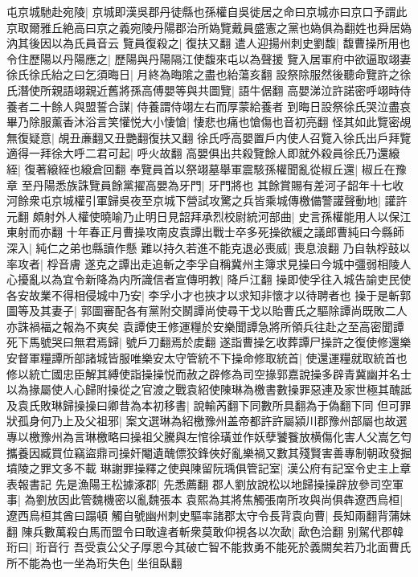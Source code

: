 屯京城馳赴宛陵|{
	京城即漢吳郡丹徒縣也孫權自吳徙居之命曰京城亦曰京口予謂此京取爾雅丘絶高曰京之義宛陵丹陽郡治所媯覽戴員盛憲之黨也媯俱為翻姓也舜居媯汭其後因以為氏員音云}
覽員復殺之|{
	復扶又翻}
遣人迎揚州刺史劉馥|{
	馥曹操所用也}
令住歷陽以丹陽應之|{
	歷陽與丹陽隔江使馥來屯以為聲援}
覽入居軍府中欲逼取翊妻徐氏徐氏紿之曰乞須晦日|{
	月終為晦隂之盡也紿蕩亥翻}
設祭除服然後聽命覽許之徐氏潛使所親語翊親近舊將孫高傅嬰等與共圖覽|{
	語牛倨翻}
高嬰涕泣許諾密呼翊時侍養者二十餘人與盟誓合謀|{
	侍養謂侍翊左右而厚蒙給養者}
到晦日設祭徐氏哭泣盡哀畢乃除服薰香沐浴言笑懽悦大小悽愴|{
	悽悲也痛也愴傷也音初亮翻}
怪其如此覽密覘無復疑意|{
	覘丑亷翻又丑艷翻復扶又翻}
徐氏呼高嬰置戶内使人召覽入徐氏出戶拜覽適得一拜徐大呼二君可起|{
	呼火故翻}
高嬰俱出共殺覽餘人即就外殺員徐氏乃還縗絰|{
	復著縗絰也縗倉回翻}
奉覽員首以祭翊墓舉軍震駭孫權聞亂從椒丘還|{
	椒丘在豫章}
至丹陽悉族誅覽員餘黨擢高嬰為牙門|{
	牙門將也}
其餘賞賜有差河子韶年十七收河餘衆屯京城權引軍歸吳夜至京城下營試攻驚之兵皆乘城傳檄備警讙聲動地|{
	讙許元翻}
頗射外人權使曉喻乃止明日見韶拜承烈校尉統河部曲|{
	史言孫權能用人以保江東射而亦翻}
十年春正月曹操攻南皮袁譚出戰士卒多死操欲緩之議郎曹純曰今縣師深入|{
	純仁之弟也縣讀作懸}
難以持久若進不能克退必喪威|{
	喪息浪翻}
乃自執桴鼓以率攻者|{
	桴音膚}
遂克之譚出走追斬之李孚自稱冀州主簿求見操曰今城中彊弱相陵人心擾亂以為宜令新降為内所識信者宣傳明教|{
	降戶江翻}
操即使孚往入城告諭吏民使各安故業不得相侵城中乃安|{
	李孚小才也挾才以求知非懷才以待聘者也}
操于是斬郭圖等及其妻子|{
	郭圖審配各有黨附交鬭譚尚使尋干戈以貽曹氏之驅除譚尚既敗二人亦誅禍福之報為不爽矣}
袁譚使王修運糧於安樂聞譚急將所領兵往赴之至高密聞譚死下馬號哭曰無君焉歸|{
	號戶刀翻焉於䖍翻}
遂詣曹操乞收葬譚尸操許之復使修還樂安督軍糧譚所部諸城皆服唯樂安太守管統不下操命修取統首|{
	使還運糧就取統首也}
修以統亡國忠臣解其縛使詣操操悦而赦之辟修為司空掾郭嘉說操多辟青冀幽并名士以為掾屬使人心歸附操從之官渡之戰袁紹使陳琳為檄書數操罪惡連及家世極其醜詆及袁氏敗琳歸操操曰卿昔為本初移書|{
	說輸芮翻下同數所具翻為于偽翻下同}
但可罪狀孤身何乃上及父祖邪|{
	案文選琳為紹檄豫州盖帝都許許屬潁川郡豫州部屬也故選專以檄豫州為言琳檄略曰操祖父騰與左悺徐璜並作妖孽饕餮放横傷化害人父嵩乞匄攜養因臧買位竊盜鼎司操奸閹遺醜僄狡鋒俠好亂樂禍又數其殘賢害善專制朝政發掘墳陵之罪文多不載}
琳謝罪操釋之使與陳留阮瑀俱管記室|{
	漢公府有記室令史主上章表報書記}
先是漁陽王松據涿郡|{
	先悉薦翻}
郡人劉放說松以地歸操操辟放參司空軍事|{
	為劉放因此管魏機密以亂魏張本}
袁熙為其將焦觸張南所攻與尚俱犇遼西烏桓|{
	遼西烏桓其酋曰蹋頓}
觸自號幽州刺史驅率諸郡太守令長背袁向曹|{
	長知兩翻背蒲妹翻}
陳兵數萬殺白馬而盟令曰敢違者斬衆莫敢仰視各以次歃|{
	歃色洽翻}
别駕代郡韓珩曰|{
	珩音行}
吾受袁公父子厚恩今其破亡智不能救勇不能死於義闕矣若乃北面曹氏所不能為也一坐為珩失色|{
	坐徂臥翻}
